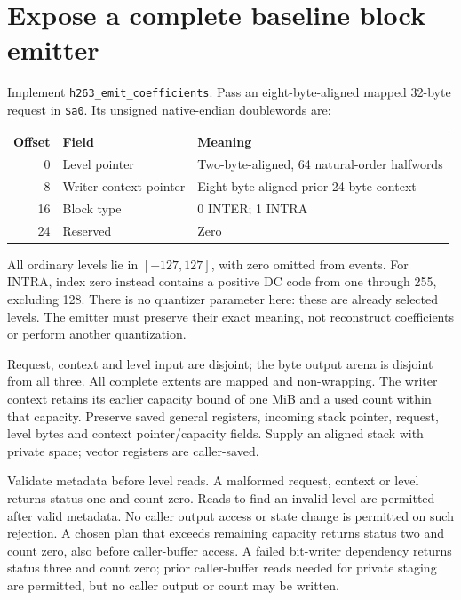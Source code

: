 \section{Expose a complete baseline block emitter}
Implement \texttt{h263\_emit\_coefficients}. Pass an eight-byte-aligned mapped
32-byte request in \texttt{\$a0}. Its unsigned native-endian doublewords are:
\begin{center}
  \begin{tabular}{rll}
    \textbf{Offset} & \textbf{Field}         & \textbf{Meaning}                             \\
    0               & Level pointer          & Two-byte-aligned, 64 natural-order halfwords \\
    8               & Writer-context pointer & Eight-byte-aligned prior 24-byte context     \\
    16              & Block type             & 0 INTER; 1 INTRA                             \\
    24              & Reserved               & Zero
  \end{tabular}
\end{center}
All ordinary levels lie in $[-127,127]$, with zero omitted from events. For INTRA,
index zero instead contains a positive DC code from one through 255, excluding
128. There is no quantizer parameter here: these are already selected levels.
The emitter must preserve their exact meaning, not reconstruct coefficients or
perform another quantization.

Request, context and level input are disjoint; the byte output arena is disjoint
from all three. All complete extents are mapped and non-wrapping. The writer
context retains its earlier capacity bound of one MiB and a used count within
that capacity. Preserve saved general registers, incoming stack pointer, request,
level bytes and context pointer/capacity fields. Supply an aligned stack with
private space; vector registers are caller-saved.

Validate metadata before level reads. A malformed request, context or level
returns status one and count zero. Reads to find an invalid level are permitted
after valid metadata. No caller output access or state change is permitted on
such rejection. A chosen plan that exceeds remaining capacity returns status two
and count zero, also before caller-buffer access. A failed bit-writer dependency
returns status three and count zero; prior caller-buffer reads needed for private
staging are permitted, but no caller output or count may be written.

